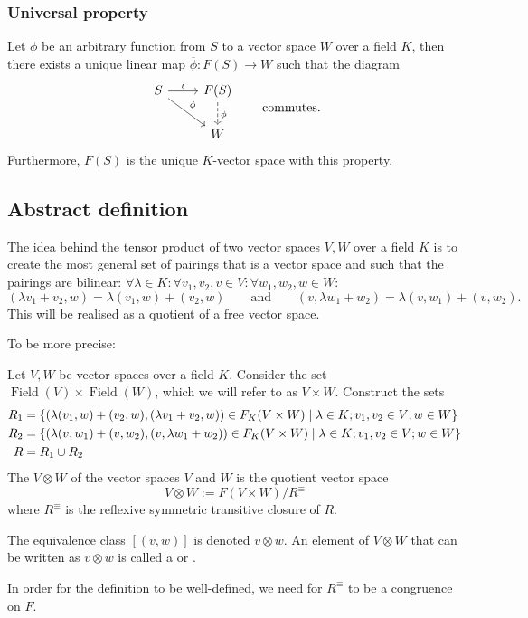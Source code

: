 \subsubsection{Universal property}
\begin{proposition}
Let $\phi$ be an arbitrary function from $S$ to a vector space $W$ over a field $K$, then there exists a unique linear map $\overline{\phi}: F(S)\to W$ such that the diagram
\[ \begin{tikzcd}
S \ar[r,"\iota"] \ar[dr,"\phi"] & F(S) \ar[d,dashed,"\overline{\phi}"] \\
& W
\end{tikzcd} \qquad \text{commutes.} \]
Furthermore, $F(S)$ is the unique $K$-vector space with this property.
\end{proposition}

\subsection{Abstract definition}
The idea behind the tensor product of two vector spaces $V,W$ over a field $K$ is to create the most general set of pairings that is a vector space and such that the pairings are bilinear: $\forall \lambda\in K: \forall v_1,v_2,v\in V:\forall w_1,w_2,w\in W$:
\[ (\lambda v_1+v_2, w) = \lambda (v_1,w)+(v_2,w) \qquad\text{and}\qquad (v,\lambda w_1+w_2) = \lambda (v,w_1) + (v,w_2). \]
This will be realised as a quotient of a free vector space.

To be more precise:
\begin{definition}
Let $V,W$ be vector spaces over a field $K$.
Consider the set $\operatorname{Field}(V)\times \operatorname{Field}(W)$, which we will refer to as $V\times W$. Construct the sets
\begin{align*}
R_1 &= \left\{ (\lambda(v_1,w)+(v_2,w),(\lambda v_1+v_2, w))\in F_K(V\times W) \;\middle|\; \lambda\in K; v_1,v_2\in V; w\in W \right\} \\
R_2 &= \left\{ (\lambda(v,w_1)+(v,w_2),(v, \lambda w_1 + w_2))\in F_K(V\times W) \;\middle|\; \lambda\in K; v_1,v_2\in V; w\in W \right\} \\
R &= R_1\cup R_2
\end{align*}
The  $V\otimes W$ of the vector spaces $V$ and $W$ is the quotient vector space
\[ V\otimes W := F(V\times W)/R^\equiv \]
where $R^\equiv$ is the reflexive symmetric transitive closure of $R$.

The equivalence class $[(v,w)]$ is denoted $v\otimes w$. An element of $V\otimes W$ that can be written as $v\otimes w$ is called a  or .
\end{definition}
In order for the definition to be well-defined, we need for $R^\equiv$ to be a congruence on $F$.

